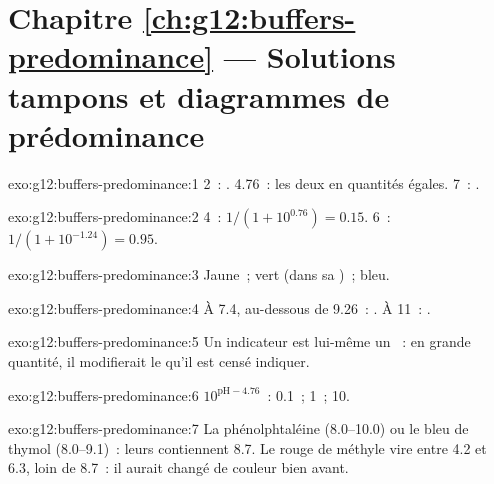 \section*{Chapitre \ref{ch:g12:buffers-predominance} --- Solutions tampons et diagrammes de prédominance}

\begin{solution}{exo:g12:buffers-predominance:1}
 2~: .  4.76~: les deux en quantités égales.  7~:
.
\end{solution}

\begin{solution}{exo:g12:buffers-predominance:2}
 4~: $1/(1 + 10^{0.76}) = 0.15$.  6~: $1/(1 + 10^{-1.24}) = 0.95$.
\end{solution}

\begin{solution}{exo:g12:buffers-predominance:3}
Jaune~; vert (dans sa )~; bleu.
\end{solution}

\begin{solution}{exo:g12:buffers-predominance:4}
À  7.4, au-dessous de 9.26~: . À  11~: .
\end{solution}

\begin{solution}{exo:g12:buffers-predominance:5}
Un indicateur est lui-même un ~: en grande quantité, il
modifierait le  qu'il est censé indiquer.
\end{solution}

\begin{solution}{exo:g12:buffers-predominance:6}
$10^{\mathrm{pH} - 4.76}$~: 0.1~; 1~; 10.
\end{solution}

\begin{solution}{exo:g12:buffers-predominance:7}
La phénolphtaléine (8.0--10.0) ou le bleu de thymol (8.0--9.1)~: leurs
 contiennent 8.7. Le rouge de méthyle vire entre 4.2 et
6.3, loin de 8.7~: il aurait changé de couleur bien avant.
\end{solution}

